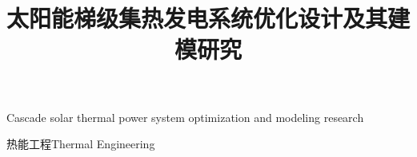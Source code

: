 \makenomenclature

\title{太阳能梯级集热发电系统优化设计\newline 及其建模研究}{Cascade solar thermal power system optimization and modeling research}
\author
{}{}
\major
{热能工程}{Thermal Engineering}
\supervisor
{}{}
